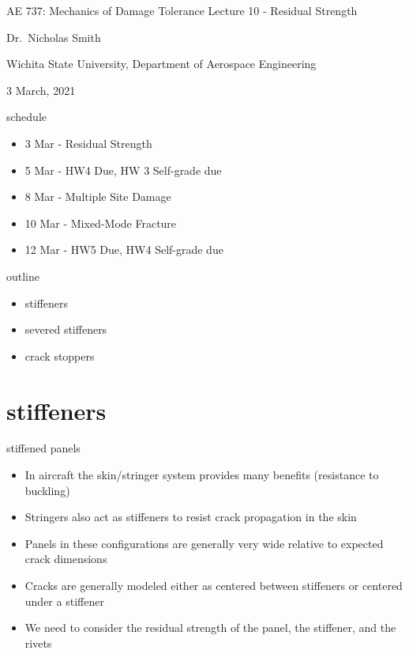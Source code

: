 \documentclass[
  letterpaper,
  ignorenonframetext,
  aspectratio=43,
  handout,
  12pt]{beamer}
\author{}
\date{}
\providecommand{\tightlist}{%
  \setlength{\itemsep}{0pt}\setlength{\parskip}{0pt}}
\providecommand{\tightlist}{%
\setlength{\itemsep}{0pt}\setlength{\parskip}{0pt}}
\begin{document}
\begin{frame}{AE 737: Mechanics of Damage Tolerance}
\protect\hypertarget{ae-737-mechanics-of-damage-tolerance}{}
Lecture 10 - Residual Strength

Dr.~Nicholas Smith

Wichita State University, Department of Aerospace Engineering

3 March, 2021
\end{frame}

\begin{frame}{schedule}
\protect\hypertarget{schedule}{}
\begin{itemize}
\tightlist
\item
  3 Mar - Residual Strength
\item
  5 Mar - HW4 Due, HW 3 Self-grade due
\item
  8 Mar - Multiple Site Damage
\item
  10 Mar - Mixed-Mode Fracture
\item
  12 Mar - HW5 Due, HW4 Self-grade due
\end{itemize}
\end{frame}

\begin{frame}{outline}
\protect\hypertarget{outline}{}
\begin{itemize}
\tightlist
\item
  stiffeners
\item
  severed stiffeners
\item
  crack stoppers
\end{itemize}
\end{frame}

\hypertarget{stiffeners}{%
\section{stiffeners}\label{stiffeners}}

\begin{frame}{stiffened panels}
\protect\hypertarget{stiffened-panels}{}
\begin{itemize}
\tightlist
\item
  In aircraft the skin/stringer system provides many benefits
  (resistance to buckling)
\item
  Stringers also act as stiffeners to resist crack propagation in the
  skin
\item
  Panels in these configurations are generally very wide relative to
  expected crack dimensions
\item
  Cracks are generally modeled either as centered between stiffeners or
  centered under a stiffener
\item
  We need to consider the residual strength of the panel, the stiffener,
  and the rivets
\end{itemize}
\end{frame}
\end{document}
